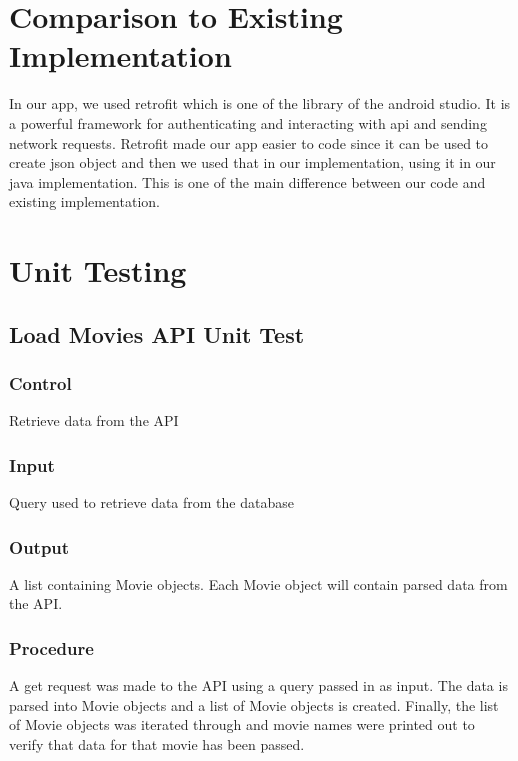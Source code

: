 \documentclass[12pt, titlepage]{article}
\begin{document}
	
\section{Comparison to Existing Implementation}	

In our app, we used retrofit which is one of the library of the android studio. It is a powerful framework for authenticating and interacting with api and sending network requests. Retrofit made our app easier to code since it can be used to create json object and then we used that in our implementation, using it in our java implementation. This is one of the main difference between our code and existing implementation. 

\section{Unit Testing}
\subsection{Load Movies API Unit Test}
\subsubsection{Control}

Retrieve data from the API

\subsubsection{Input}

Query used to retrieve data from the database 

\subsubsection{Output}

A list containing Movie objects. Each Movie object will contain parsed data from the API. 

\subsubsection{Procedure}

A get request was made to the API using a query passed in as input. The data is parsed into Movie objects 
and a list of Movie objects is created. Finally, the list of Movie objects was iterated through and movie names were printed out to verify that data for that movie has been passed. 
\end{document}
